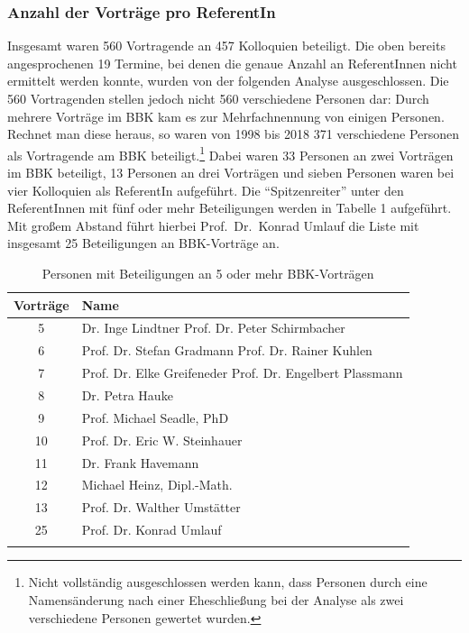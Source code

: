 \documentclass[a4paper,
fontsize=11pt,
oneside,
numbers=noperiodatend,
parskip=half-,
bibliography=totoc,
final
]{scrartcl}
\begin{document}
\hypertarget{anzahl-der-vortruxe4ge-pro-referentin}{%
\subsubsection{Anzahl der Vorträge pro
ReferentIn}\label{anzahl-der-vortruxe4ge-pro-referentin}}

Insgesamt waren 560 Vortragende an 457 Kolloquien beteiligt. Die oben
bereits angesprochenen 19 Termine, bei denen die genaue Anzahl an
ReferentInnen nicht ermittelt werden konnte, wurden von der folgenden
Analyse ausgeschlossen. Die 560 Vortragenden stellen jedoch nicht 560
verschiedene Personen dar: Durch mehrere Vorträge im BBK kam es zur
Mehrfachnennung von einigen Personen. Rechnet man diese heraus, so waren
von 1998 bis 2018 371 verschiedene Personen als Vortragende am BBK
beteiligt.\footnote{Nicht vollständig ausgeschlossen werden kann, dass
  Personen durch eine Namensänderung nach einer Eheschließung bei der
  Analyse als zwei verschiedene Personen gewertet wurden.} Dabei waren
33 Personen an zwei Vorträgen im BBK beteiligt, 13 Personen an drei
Vorträgen und sieben Personen waren bei vier Kolloquien als ReferentIn
aufgeführt. Die \enquote{Spitzenreiter} unter den ReferentInnen mit fünf
oder mehr Beteiligungen werden in Tabelle 1 aufgeführt. Mit großem
Abstand führt hierbei Prof.~Dr.~Konrad Umlauf die Liste mit insgesamt 25
Beteiligungen an BBK-Vorträge an.

\pagebreak

\begin{longtable}[]{@{}cp{5.5cm}@{}}
\toprule
\textbf{Vorträge} & \textbf{Name} \\
\midrule
5 & Dr. Inge Lindtner \newline Prof. Dr. Peter Schirmbacher \\
\midrule
6 & Prof. Dr. Stefan Gradmann \newline Prof. Dr. Rainer Kuhlen \\
\midrule
7 & Prof. Dr. Elke Greifeneder \newline Prof. Dr. Engelbert Plassmann \\
\midrule
8 & Dr. Petra Hauke \\
\midrule
9 & Prof. Michael Seadle, PhD \\
\midrule
10 & Prof. Dr. Eric W. Steinhauer \\
\midrule
11 & Dr. Frank Havemann \\
\midrule 
12 & Michael Heinz, Dipl.-Math. \\
\midrule
13 & Prof. Dr. Walther Umstätter \\
\midrule
25 & Prof. Dr. Konrad Umlauf \\
\bottomrule
\caption{Personen mit Beteiligungen an 5 oder mehr BBK-Vorträgen}
\end{longtable}
\end{document}
